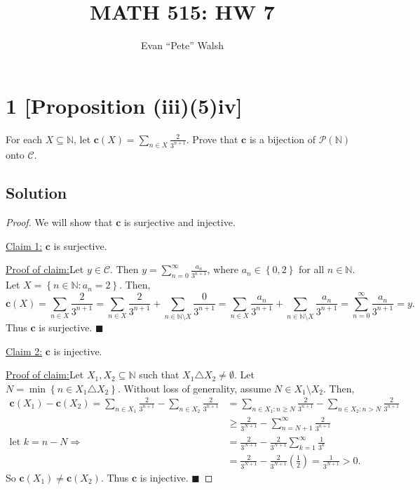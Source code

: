 \documentclass[12pt]{article}
\title{MATH 515: HW 7}
\author{Evan ``Pete'' Walsh}
\newenvironment{claimproof}[1]{\par\noindent\underline{Proof of claim:}\space#1}{\hfill $\blacksquare$\vspace{5mm}}
\begin{document}
\maketitle

\section*{1 [Proposition (iii)(5)iv]}
For each $X\subseteq \mathbb{N}$, let $\bm{c}(X) = \sum_{n\in X}\frac{2}{3^{n+1}}$. Prove that $\bm{c}$ is a bijection of $\mathcal{P}(\mathbb{N})$ onto $\mathcal{C}$.

\subsection*{Solution}
\begin{proof} We will show that $\bm{c}$ is surjective and injective.

\underline{Claim 1:} $\bm{c}$ is surjective.

\begin{claimproof}
Let $y \in \mathcal{C}$. Then $y = \sum_{n=0}^{\infty}\frac{a_{n}}{3^{n+1}}$, where $a_{n} \in \left\{ 0, 2 \right\}$ for all $n \in \mathbb{N}$. Let
$X = \left\{ n \in \mathbb{N} : a_{n} = 2 \right\}$. Then,
\[ \bm{c}(X) = \sum_{n\in X}\frac{2}{3^{n+1}} = \sum_{n\in X}\frac{2}{3^{n+1}} + \sum_{n \in \mathbb{N}\setminus X}\frac{0}{3^{n+1}} = \sum_{n\in
X}\frac{a_{n}}{3^{n+1}} + \sum_{n\in \mathbb{N}\setminus X}\frac{a_{n}}{3^{n+1}} = \sum_{n=0}^{\infty}\frac{a_{n}}{3^{n+1}} = y. \]
Thus $\bm{c}$ is surjective.
\end{claimproof}

\underline{Claim 2:} $\bm{c}$ is injective.

\begin{claimproof}
Let $X_{1}, X_{2} \subseteq \mathbb{N}$ such that $X_{1} \triangle X_{2} \neq \emptyset$. Let $N = \min\left\{ n \in X_{1} \triangle X_{2} \right\}$.
Without loss of generality, assume $N \in X_{1} \setminus X_{2}$. Then,
\begin{align*}
\bm{c}(X_{1}) - \bm{c}(X_{2}) = \sum_{n \in X_{1}}\frac{2}{3^{n+1}} - \sum_{n \in X_{2}}\frac{2}{3^{n+1}} & = \sum_{n \in X_{1}: n \geq
N}\frac{2}{3^{n+1}} - \sum_{n\in X_{2} : n > N}\frac{2}{3^{n+1}} \\
& \geq \frac{2}{3^{N+1}} - \sum_{n = N+1}^{\infty}\frac{2}{3^{n+1}} \\
\text{let } k = n - N \Rightarrow \qquad & = \frac{2}{3^{N+1}} - \frac{2}{3^{N+1}}\sum_{k=1}^{\infty}\frac{1}{3^{k}} \\
& = \frac{2}{3^{N+1}} - \frac{2}{3^{N+1}}\left( \frac{1}{2} \right) = \frac{1}{3^{N+1}} > 0.
\end{align*}
So $\bm{c}(X_{1}) \neq \bm{c}(X_{2})$. Thus $\bm{c}$ is injective.
\end{claimproof}

\vspace{-5mm}
\end{proof}
\end{document}

